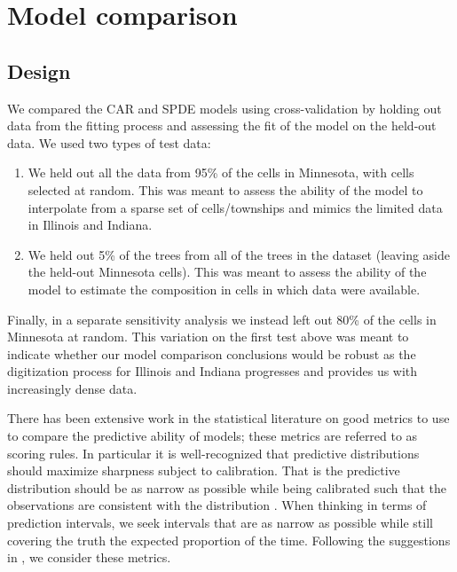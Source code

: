 \documentclass[12pt]{article}\usepackage[]{graphicx}\usepackage[]{color}
\begin{document}
\section{Model comparison}


\subsection{Design}

We compared the CAR and SPDE models using cross-validation by holding
out data from the fitting process and assessing the fit of the model
on the held-out data. We used two types of test data:
\begin{enumerate}
\item We held out all the data from 95\% of the cells in Minnesota, with
cells selected at random. This was meant to assess the ability of
the model to interpolate from a sparse set of cells/townships and
mimics the limited data in Illinois and Indiana.
\item We held out 5\% of the trees from all of the trees in the dataset
(leaving aside the held-out Minnesota cells). This was meant to assess
the ability of the model to estimate the composition in cells in which
data were available. 
\end{enumerate}
Finally, in a separate sensitivity analysis we instead left out 80\%
of the cells in Minnesota at random. This variation on the first test
above was meant to indicate whether our model comparison conclusions
would be robust as the digitization process for Illinois and Indiana
progresses and provides us with increasingly dense data.

There has been extensive work in the statistical literature on good
metrics to use to compare the predictive ability of models; these
metrics are referred to as scoring rules. In particular it is well-recognized
that predictive distributions should maximize sharpness subject to
calibration. That is the predictive distribution should be as narrow
as possible while being calibrated such that the observations are
consistent with the distribution \citep{Gnei:etal:2007}. When thinking
in terms of prediction intervals, we seek intervals that are as narrow
as possible while still covering the truth the expected proportion
of the time. Following the suggestions in \citep{Gnei:etal:2007},
we consider these metrics.
\end{document}
